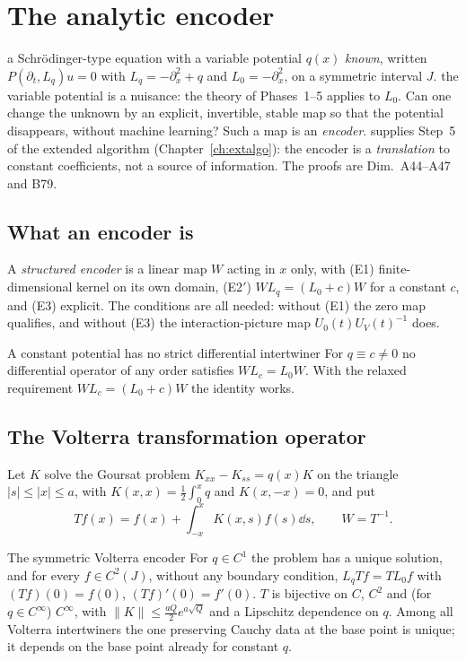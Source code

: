 \chapter{The analytic encoder}\label{ch:encoder}
\chapterbrief
{a Schr\"odinger-type equation with a variable potential $q(x)$ \emph{known}, written $P(\partial_t,L_q)u=0$ with $L_q=-\partial_x^2+q$ and $L_0=-\partial_x^2$, on a symmetric interval $J$.}
{the variable potential is a nuisance: the theory of Phases~1--5 applies to $L_0$. Can one change the unknown by an explicit, invertible, stable map so that the potential disappears, without machine learning? Such a map is an \emph{encoder}.}
{supplies Step~5 of the extended algorithm (Chapter~\ref{ch:extalgo}): the encoder is a \emph{translation} to constant coefficients, not a source of information. The proofs are Dim.~A44--A47 and B79.}

\section{What an encoder is}

A \emph{structured encoder} is a linear map $W$ acting in $x$ only, with (E1) finite-dimensional kernel on its own domain, (E2$'$) $WL_q=(L_0+c)W$ for a constant $c$, and (E3) explicit. The conditions are all needed: without (E1) the zero map qualifies, and without (E3) the interaction-picture map $U_0(t)U_V(t)^{-1}$ does.

\begin{proposition}{A constant potential has no strict differential intertwiner  \proved}\label{prop:enck0}
For $q\equiv c\ne0$ no differential operator of any order satisfies $WL_c=L_0W$. With the relaxed requirement $WL_c=(L_0+c)W$ the identity works.
\end{proposition}

\section{The Volterra transformation operator}

Let $K$ solve the Goursat problem $K_{xx}-K_{ss}=q(x)K$ on the triangle $|s|\le|x|\le a$, with $K(x,x)=\tfrac12\int_0^xq$ and $K(x,-x)=0$, and put
\[
Tf(x)=f(x)+\int_{-x}^xK(x,s)f(s)\dd s,\qquad W=T^{-1}.
\]

\begin{theorem}{The symmetric Volterra encoder  \proved}\label{thm:enc1}
For $q\in C^1$ the problem has a unique solution, and for every $f\in C^2(J)$, without any boundary condition, $L_qTf=TL_0f$ with $(Tf)(0)=f(0)$, $(Tf)'(0)=f'(0)$. $T$ is bijective on $C$, $C^2$ and (for $q\in C^\infty$) $C^\infty$, with $\|K\|\le\frac{aQ}2e^{a\sqrt Q}$ and a Lipschitz dependence on $q$. Among all Volterra intertwiners the one preserving Cauchy data at the base point is unique; it depends on the base point already for constant $q$.
\end{theorem}

